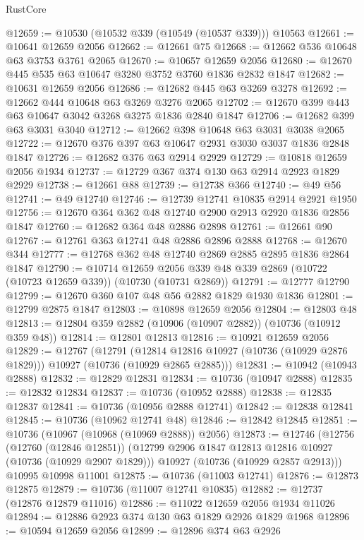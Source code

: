 \begin{lexlean}{RustCore}
\begin{coremodule}
@12659 := @10530 (@10532 @339 (@10549 (@10537 @339))) @10563
@12661 := @10641 @12659 @2056
@12662 := @12661 @75
@12668 := @12662 @536 @10648 @63 @3753 @3761 @2065
@12670 := @10657 @12659 @2056
@12680 := @12670 @445 @535 @63 @10647 @3280 @3752 @3760 @1836 @2832 @1847
@12682 := @10631 @12659 @2056
@12686 := @12682 @445 @63 @3269 @3278
@12692 := @12662 @444 @10648 @63 @3269 @3276 @2065
@12702 := @12670 @399 @443 @63 @10647 @3042 @3268 @3275 @1836 @2840 @1847
@12706 := @12682 @399 @63 @3031 @3040
@12712 := @12662 @398 @10648 @63 @3031 @3038 @2065
@12722 := @12670 @376 @397 @63 @10647 @2931 @3030 @3037 @1836 @2848 @1847
@12726 := @12682 @376 @63 @2914 @2929
@12729 := @10818 @12659 @2056 @1934
@12737 := @12729 @367 @374 @130 @63 @2914 @2923 @1829 @2929
@12738 := @12661 @88
@12739 := @12738 @366
@12740 := @49 @56
@12741 := @49 @12740
@12746 := @12739 @12741 @10835 @2914 @2921 @1950
@12756 := @12670 @364 @362 @48 @12740 @2900 @2913 @2920 @1836 @2856 @1847
@12760 := @12682 @364 @48 @2886 @2898
@12761 := @12661 @90
@12767 := @12761 @363 @12741 @48 @2886 @2896 @2888
@12768 := @12670 @344
@12777 := @12768 @362 @48 @12740 @2869 @2885 @2895 @1836 @2864 @1847
@12790 := @10714
    @12659
    @2056
    @339
    @48
    @339
    @2869
    (@10722 (@10723 @12659 @339))
    (@10730 (@10731 @2869))
@12791 := @12777 @12790
@12799 := @12670 @360 @107 @48 @56 @2882 @1829 @1930 @1836
@12801 := @12799 @2875 @1847
@12803 := @10898 @12659 @2056
@12804 := @12803 @48
@12813 := @12804 @359 @2882 (@10906 (@10907 @2882)) (@10736 (@10912 @359 @48))
@12814 := @12801 @12813
@12816 := @10921 @12659 @2056
@12829 := @12767
    (@12791
      (@12814 @12816 @10927 (@10736 (@10929 @2876 @1829)))
      @10927
      (@10736 (@10929 @2865 @2885)))
@12831 := @10942 (@10943 @2888)
@12832 := @12829 @12831
@12834 := @10736 (@10947 @2888)
@12835 := @12832 @12834
@12837 := @10736 (@10952 @2888)
@12838 := @12835 @12837
@12841 := @10736 (@10956 @2888 @12741)
@12842 := @12838 @12841
@12845 := @10736 (@10962 @12741 @48)
@12846 := @12842 @12845
@12851 := @10736 (@10967 (@10968 (@10969 @2888)) @2056)
@12873 := @12746
    (@12756
      (@12760 (@12846 @12851))
      (@12799 @2906 @1847 @12813 @12816 @10927 (@10736 (@10929 @2907 @1829)))
      @10927
      (@10736 (@10929 @2857 @2913)))
    @10995
    @10998
    @11001
@12875 := @10736 (@11003 @12741)
@12876 := @12873 @12875
@12879 := @10736 (@11007 @12741 @10835)
@12882 := @12737 (@12876 @12879 @11016)
@12886 := @11022 @12659 @2056 @1934 @11026
@12894 := @12886 @2923 @374 @130 @63 @1829 @2926 @1829 @1968
@12896 := @10594 @12659 @2056
@12899 := @12896 @374 @63 @2926

\end{coremodule}
\end{lexlean}
